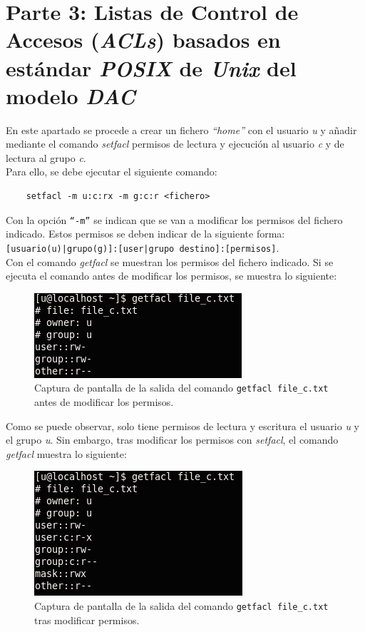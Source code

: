 \documentclass[10pt,a4paper]{article}
\begin{document}
\section{Parte 3: Listas de Control de Accesos (\emph{ACLs}) basados en estándar \emph{POSIX} de \emph{Unix} del modelo \emph{DAC}}

En este apartado se procede a crear un fichero \textit{``home''} con el usuario \textit{u} y añadir mediante el comando \textit{setfacl} permisos de lectura y ejecución al usuario \textit{c} y de lectura al grupo \textit{c}. \\

Para ello, se debe ejecutar el siguiente comando: 

\begin{lstlisting}
	setfacl -m u:c:rx -m g:c:r <fichero>
\end{lstlisting}

Con la opción \texttt{``-m''} se indican que se van a modificar los permisos del fichero indicado. Estos permisos se deben indicar de la siguiente forma: \texttt{[usuario(u)|grupo(g)]:[user|grupo destino]:[permisos]}. \\

Con el comando \textit{getfacl} se muestran los permisos del fichero indicado. Si se ejecuta el comando antes de modificar los permisos, se muestra lo siguiente:

\begin{figure}[h!]
	\centering
	\includegraphics[scale=0.7]{images/parte3_13a.png}
	\caption{Captura de pantalla de la salida del comando \texttt{getfacl file\_c.txt} antes de modificar los permisos.}
	\label{fig:parte3_13a}
\end{figure}

Como se puede observar, solo tiene permisos de lectura y escritura el usuario \textit{u} y el grupo \textit{u}.
Sin embargo, tras modificar los permisos con \textit{setfacl}, el comando \textit{getfacl} muestra lo siguiente:

\begin{figure}[h!]
	\centering
	\includegraphics[scale=0.7]{images/parte3_13b.png}
	\caption{Captura de pantalla de la salida del comando \texttt{getfacl file\_c.txt} tras modificar permisos.}
	\label{fig:parte3_13b}
\end{figure}
\end{document}
